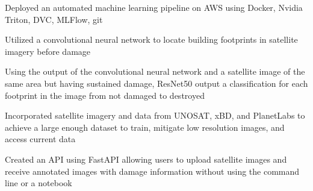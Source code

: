 \documentclass[letterpaper]{resume}
\begin{document}
% 

\begin{compactitem}
\item Deployed an automated machine learning pipeline on AWS using Docker, Nvidia Triton, DVC, MLFlow, git
\item Utilized a convolutional neural network to locate building footprints in satellite imagery before damage
\item Using the output of the convolutional neural network and a satellite image of the same area but having sustained damage, ResNet50 output a classification for each footprint in the image from not damaged to destroyed
\item Incorporated satellite imagery and data from UNOSAT, xBD, and PlanetLabs to achieve a large enough dataset to train, mitigate low resolution images, and access current data
\item Created an API using FastAPI allowing users to upload satellite images and receive annotated images with damage information without using the command line or a notebook
\end{compactitem}
\end{document}
